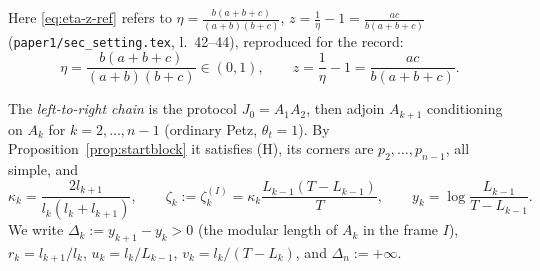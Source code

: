 \documentclass[11pt]{article}
\theoremstyle{definition}\newtheorem{example}[theorem]{Example}
\begin{document}
\noindent Here \eqref{eq:eta-z-ref} refers to
$\eta=\frac{b(a+b+c)}{(a+b)(b+c)}$, $z=\frac1\eta-1=\frac{ac}{b(a+b+c)}$
(\texttt{paper1/sec\_setting.tex}, l.~42--44), reproduced for the record:
\begin{equation}\label{eq:eta-z-ref}
 \eta=\frac{b(a+b+c)}{(a+b)(b+c)}\in(0,1),\qquad z=\frac1\eta-1=\frac{ac}{b(a+b+c)} .
\end{equation}

\begin{definition}\label{def:LR}
The \emph{left-to-right chain} is the protocol $J_0=A_1A_2$, then adjoin $A_{k+1}$ conditioning on
$A_k$ for $k=2,\dots,n-1$ (ordinary Petz, $\theta_t=1$).  By
Proposition~\ref{prop:startblock} it satisfies (H), its corners are $p_2,\dots,p_{n-1}$, all
simple, and
\begin{equation}\label{eq:LR-data}
 \kappa_k=\frac{2l_{k+1}}{l_k(l_k+l_{k+1})},\qquad
 \zeta_k:=\zeta^{(I)}_k=\kappa_k\frac{L_{k-1}(T-L_{k-1})}T,\qquad
 y_k=\log\frac{L_{k-1}}{T-L_{k-1}} .
\end{equation}
We write $\Delta_k:=y_{k+1}-y_k>0$ (the modular length of $A_k$ in the frame $I$),
$r_k=l_{k+1}/l_k$, $u_k=l_k/L_{k-1}$, $v_k=l_k/(T-L_k)$, and $\Delta_n:=+\infty$.
\end{definition}
\end{document}
